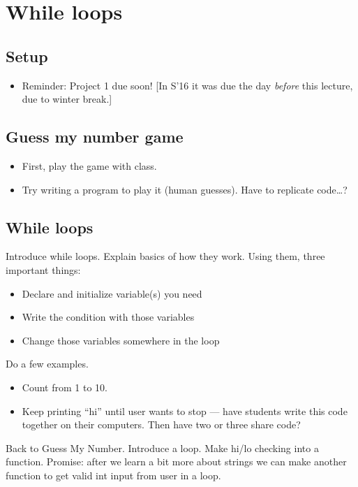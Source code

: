 \documentclass{article}
\begin{document}
\newpage
\section{While loops}

\subsection*{Setup}
\begin{itemize}
\item Reminder: Project 1 due soon! [In S'16 it was due the day
  \emph{before} this lecture, due to winter break.]
\end{itemize}

\subsection*{Guess my number game}

\begin{itemize}
\item First, play the game with class.
\item Try writing a program to play it (human guesses). Have to
  replicate code\dots?
\end{itemize}

\subsection*{While loops}

Introduce while loops.  Explain basics of how they work.
Using them, three important things:
\begin{itemize}
\item Declare and initialize variable(s) you need
\item Write the condition with those variables
\item Change those variables somewhere in the loop
\end{itemize}

Do a few examples.
\begin{itemize}
\item Count from 1 to 10.
\item Keep printing ``hi'' until user wants to stop --- have students
  write this code together on their computers.  Then have two or three
  share code?
\end{itemize}

Back to Guess My Number.  Introduce a loop.  Make hi/lo checking into
a function.  Promise: after we learn a bit more about strings we can
make another function to get valid int input from user in a loop.
\end{document}
